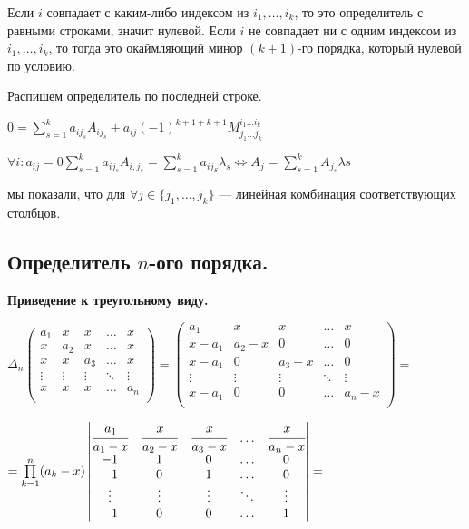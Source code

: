 Если \(i\) совпадает с каким-либо индексом из \(i_1, \ldots, i_k\), то это определитель с равными строками, значит нулевой. Если \(i\) не совпадает ни с одним индексом из \(i_1, \ldots, i_k\), то тогда это окаймляющий минор \((k + 1)\)-го порядка, который нулевой по условию.

Распишем определитель по последней строке.

\( 0  = \sum\limits_{s=1}^{k} a_{i j_s} A_{ij_s} + a_{ij} (-1)^{k+1+k+1} M_{j_1\ldots j_k}^{i_1 \ldots i_k}\)

\(\forall i : a_{ij} =  0 \sum\limits_{s=1}^k a_{i j_s} A_{i,j_s} = \sum\limits_{s=1}^{k}a_{ij_S} \lambda_s \Leftrightarrow A_j = \sum\limits_{s=1}^{k}  A_{j_s} \lambda s\)

мы показали, что для \(\forall j \in \{j_1,\ldots,j_k\}\) --- линейная комбинация  соответствующих столбцов.


\subsection{Определитель \(n\)-ого порядка.}


\textbf{Приведение к треугольному виду.}

\( \Delta_n \begin{pmatrix}
    a_1    & x      & x      & \ldots & x      \\
    x      & a_2    & x      & \ldots & x      \\
    x      & x      & a_3    & \ldots & x      \\
    \vdots & \vdots & \vdots & \ddots & \vdots \\
    x      & x      & x      & \ldots & a_n    \\
\end{pmatrix}
=
\begin{pmatrix}
    a_1    & x       & x      & \ldots & x      \\
    x-a_1  & a_2 - x & 0      & \ldots & 0      \\
    x-a_1  & 0       & a_3 -x & \ldots & 0      \\
    \vdots & \vdots  & \vdots & \ddots & \vdots \\
    x-a_1  & 0       & 0      & \ldots & a_n-x  \\
\end{pmatrix}
=\)


\( =
\prod\limits_{k=1}^n (a_k-x)
\begin{vmatrix}
    \cfrac{a_1}{a_1-x} & \cfrac{x}{a_2-x} & \cfrac{x}{a_3-x} & \ldots & \cfrac{x}{a_n-x} \\
    -1                 & 1                & 0                & \ldots & 0                \\
    -1                 & 0                & 1                & \ldots & 0                \\
    \vdots             & \vdots           & \vdots           & \ddots & \vdots           \\
    -1                 & 0                & 0                & \ldots & 1                \\
\end{vmatrix}
= \)

